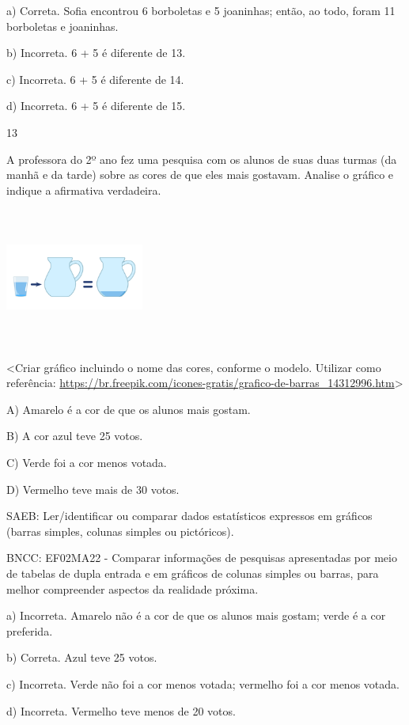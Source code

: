 \begin{escolha}
\begin{escolha}
{{{{{{{{a) Correta. Sofia encontrou 6 borboletas e 5 joaninhas; então, ao todo,
foram 11 borboletas e joaninhas.

b) Incorreta. 6 + 5 é diferente de 13.

c) Incorreta. 6 + 5 é diferente de 14.

d) Incorreta. 6 + 5 é diferente de 15.

\num{13}

A professora do 2º ano fez uma pesquisa com os alunos de suas duas
turmas (da manhã e da tarde) sobre as cores de que eles mais gostavam.
Analise o gráfico e indique a afirmativa verdadeira.

\includegraphics[width=1.78819in,height=1.78819in]{media/image140.png}

\textless{}Criar gráfico incluindo o nome das cores, conforme o modelo.
Utilizar como referência:
\url{https://br.freepik.com/icones-gratis/grafico-de-barras_14312996.htm}\textgreater{}

A) Amarelo é a cor de que os alunos mais gostam.

B) A cor azul teve 25 votos.

C) Verde foi a cor menos votada.

D) Vermelho teve mais de 30 votos.

SAEB: Ler/identificar ou comparar dados estatísticos expressos
em gráficos (barras simples, colunas simples ou pictóricos).

BNCC: EF02MA22 - Comparar informações de pesquisas apresentadas por meio
de tabelas de dupla entrada e em gráficos de colunas simples ou barras,
para melhor compreender aspectos da realidade próxima.

a) Incorreta. Amarelo não é a cor de que os alunos mais gostam; verde é a
cor preferida.

b) Correta. Azul teve 25 votos.

c) Incorreta. Verde não foi a cor menos votada; vermelho foi a cor menos votada.

d) Incorreta. Vermelho teve menos de 20 votos.

}}}}}}}}
\end{escolha}
\end{escolha}
